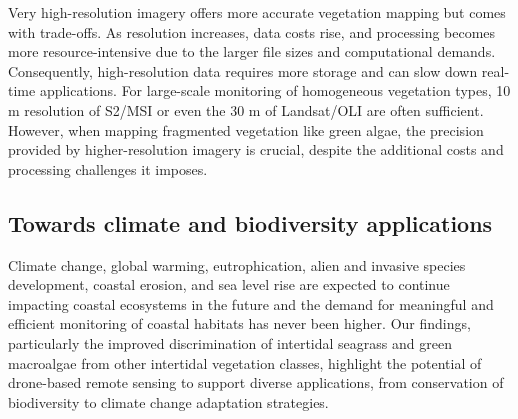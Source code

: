 \documentclass[
  number]{elsarticle}
\begin{document}
Very high-resolution imagery offers more accurate vegetation mapping but
comes with trade-offs. As resolution increases, data costs rise, and
processing becomes more resource-intensive due to the larger file sizes
and computational demands. Consequently, high-resolution data requires
more storage and can slow down real-time applications. For large-scale
monitoring of homogeneous vegetation types, 10 m resolution of S2/MSI or
even the 30 m of Landsat/OLI are often sufficient. However, when mapping
fragmented vegetation like green algae, the precision provided by
higher-resolution imagery is crucial, despite the additional costs and
processing challenges it imposes.

\subsection{Towards climate and biodiversity
applications}\label{towards-climate-and-biodiversity-applications}

Climate change, global warming, eutrophication, alien and invasive
species development, coastal erosion, and sea level rise are expected to
continue impacting coastal ecosystems in the future
\citep{SCHIBALSKI2022101414, holon2018predictive, marquet2024global} and
the demand for meaningful and efficient monitoring of coastal habitats
has never been
higher\citep{muller2018satellite, villalobos2023remote, oiry2021using}.
Our findings, particularly the improved discrimination of intertidal
seagrass and green macroalgae from other intertidal vegetation classes,
highlight the potential of drone-based remote sensing to support diverse
applications, from conservation of biodiversity to climate change
adaptation strategies.
\end{document}
